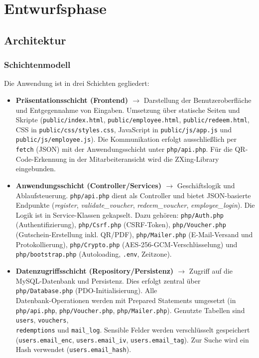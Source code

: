 \section{Entwurfsphase} 
\label{sec:Entwurfsphase}

\subsection{Architektur}

\subsubsection{Schichtenmodell}
Die Anwendung ist in drei Schichten gegliedert:

\begin{itemize}
  \item \textbf{Präsentationsschicht (Frontend) $\rightarrow$} Darstellung der Benutzeroberfläche und Entgegennahme von Eingaben.  
Umsetzung über statische Seiten und Skripte (\texttt{public/index.html}, \texttt{public/employee.html}, \texttt{public/redeem.html}, CSS in \texttt{public/css/styles.css}, JavaScript in \texttt{public/js/app.js} und \texttt{public/js/employee.js}).  
Die Kommunikation erfolgt ausschließlich per \texttt{fetch} (\ac{JSON}) mit der Anwendungsschicht unter \texttt{php/api.php}.  
Für die QR-Code-Erkennung in der Mitarbeiteransicht wird die ZXing-Library eingebunden.

  \item \textbf{Anwendungsschicht (Controller/Services) $\rightarrow$} Geschäftslogik und \\ Ablaufsteuerung.  
\texttt{php/api.php} dient als Controller und bietet \ac{JSON}-basierte Endpunkte (\zB \textit{register}, \textit{validate\_voucher}, \textit{redeem\_voucher}, \textit{employee\_login}).  
Die Logik ist in Service-Klassen gekapselt. Dazu gehören:  
\texttt{php/Auth.php} (Authentifizierung),  
\texttt{php/Csrf.php} (\ac{CSRF}-Token),  
\texttt{php/Voucher.php} (Gutschein-Erstellung inkl. QR/PDF),  
\texttt{php/Mailer.php} (E-Mail-Versand und Protokollierung),  
\texttt{php/Crypto.php} (\ac{AES}-256-GCM-Verschlüsselung)  
und \texttt{php/bootstrap.php} (Autoloading, \texttt{.env}, Zeitzone).

  \item \textbf{Datenzugriffsschicht (Repository/Persistenz) $\rightarrow$} Zugriff auf die MySQL-Datenbank und Persistenz.  
Dies erfolgt zentral über \texttt{php/Database.php} (PDO-Initialisierung).  
Alle \\ Datenbank-Operationen werden mit Prepared Statements umgesetzt (\zB in \texttt{php/api.php}, \texttt{php/Voucher.php}, \texttt{php/Mailer.php}).  
Genutzte Tabellen sind \texttt{users}, \texttt{vouchers}, \\ \texttt{redemptions} und \texttt{mail\_log}.  
Sensible Felder werden verschlüsselt gespeichert \\ (\texttt{users.email\_enc}, \texttt{users.email\_iv}, \texttt{users.email\_tag}).  
Zur Suche wird ein Hash verwendet (\texttt{users.email\_hash}).
\end{itemize}

